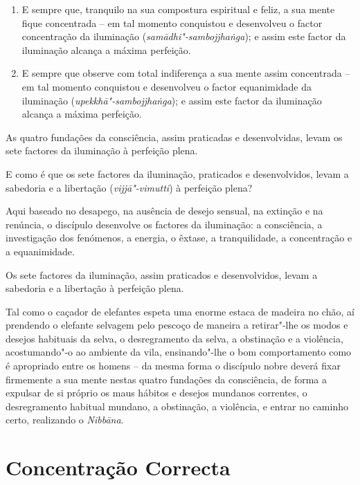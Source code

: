 \begin{enumerate}
  \item E sempre que, tranquilo na sua compostura espiritual e feliz, a sua
        mente fique concentrada -- em tal momento conquistou e desenvolveu o
        factor concentração da iluminação (\emph{samādhi"-sambojjhaṅga}); e assim
        este factor da iluminação alcança a máxima perfeição.

  \item E sempre que observe com total indiferença a sua mente assim concentrada
        -- em tal momento conquistou e desenvolveu o factor equanimidade da
        iluminação (\emph{upekkhā"-sambojjhaṅga}); e assim este factor da
        iluminação alcança a máxima perfeição.

\end{enumerate}

As quatro fundações da consciência, assim praticadas e desenvolvidas, levam os
sete factores da iluminação à perfeição plena.

E como é que os sete factores da iluminação, praticados e desenvolvidos, levam a
sabedoria e a libertação (\emph{vijjā"-vimutti}) à perfeição plena?

Aqui baseado no desapego, na ausência de desejo sensual, na extinção e na renúncia,
o discípulo desenvolve os factores da iluminação: a consciência, a
investigação dos fenómenos, a energia, o êxtase, a tranquilidade, a concentração
e a equanimidade.

Os sete factores da iluminação, assim praticados e desenvolvidos, levam a
sabedoria e a libertação à perfeição plena.


Tal como o caçador de elefantes espeta uma enorme estaca de madeira no chão,
aí prendendo o elefante selvagem pelo pescoço de maneira a retirar"-lhe os modos
e desejos habituais da selva, o desregramento da selva, a obstinação e a
violência, acostumando"-o ao ambiente da vila, ensinando"-lhe o bom comportamento
como é apropriado entre os homens -- da mesma forma o discípulo nobre deverá
fixar firmemente a sua mente nestas quatro fundações da consciência, de forma a
expulsar de si próprio os maus hábitos e desejos mundanos correntes, o
desregramento habitual mundano, a obstinação, a violência, e entrar no caminho
certo, realizando o \emph{Nibbāna}.


\section{Concentração Correcta}

